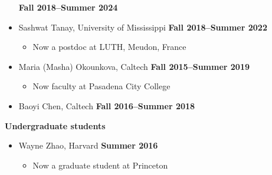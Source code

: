 \documentclass[margin,line]{res}
\begin{document}
\begin{resume}
\begin{itemize}
\hfill {\bf Fall 2018--Summer 2024}
\item[] Sashwat Tanay, University of Mississippi
\hfill {\bf Fall 2018--Summer 2022}
\begin{itemize}
\vspace{-.05in}
\item[] Now a postdoc at LUTH, Meudon, France
\end{itemize}
\item[] Maria (Masha) Okounkova, Caltech
\hfill {\bf Fall 2015--Summer 2019}
\begin{itemize}
\vspace{-.05in}
\item[] Now faculty at Pasadena City College
\end{itemize}
\item[] Baoyi Chen, Caltech
\hfill {\bf Fall 2016--Summer 2018}
\end{itemize}

%

{\bf Undergraduate students}
\begin{itemize}
\item[] Wayne Zhao, Harvard
\hfill {\bf Summer 2016}
\begin{itemize}
\vspace{-.05in}
\item[] Now a graduate student at Princeton
\end{itemize}
\end{itemize}


\end{resume}
\end{document}
